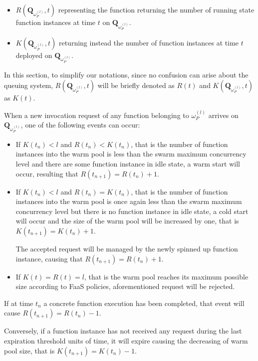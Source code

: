 \documentclass[12pt,a4paper]{report}
\begin{document}
\begin{itemize}
	\item $R(\textbf{Q}_{\omega_{P}^{(l)}}, t)$ representing the function returning the number of running state function instances at time $t$ on $\textbf{Q}_{\omega_{P}^{(l)}}$.
	
	\item $K(\textbf{Q}_{\omega_{P}^{(l)}}, t)$ returning instead the number of function instances at time $t$ deployed on $\textbf{Q}_{\omega_{P}^{(l)}}$.
\end{itemize}

In this section, to simplify our notations, since no confusion can arise about the queuing system, $R(\textbf{Q}_{\omega_{P}^{(l)}}, t)$ will be briefly denoted as $R(t)$ and $K(\textbf{Q}_{\omega_{P}^{(l)}}, t)$ as $K(t)$.

When a new invocation request of any function belonging to $\omega_{P}^{(l)}$ arrives on $\textbf{Q}_{\omega_{P}^{(l)}}$, one of the following events can occur:

\begin{itemize}
	\item If $K(t_n) < l$ and $R(t_n) < K(t_n)$, that is the number of function instances into the warm pool is less than the swarm maximum concurrency level and there are some function instance in idle state, a warm start will occur, resulting that $R(t_{n+1}) = R(t_n) + 1$.
	
	
	\item If $K(t_n) < l$ and $R(t_n) = K(t_n)$, that is the number of function instances into the warm pool is once again less than the swarm maximum concurrency level but there is no function instance in idle state, a cold start will occur and the size of the warm pool will be increased by one, that is $K(t_{n+1}) = K(t_n) + 1$.
	
	The accepted request will be managed by the newly spinned up function instance, causing that $R(t_{n+1}) = R(t_n) + 1$.
	
	\item If $K(t) = R(t) = l$, that is the warm pool reaches its maximum possible size according to FaaS policies, aforementioned request will be rejected.
\end{itemize}

If at time $t_n$ a concrete function execution has been completed, that event will cause $R(t_{n+1}) = R(t_n) - 1$. 

Conversely, if a function instance has not  received any request during the last expiration threshold units of time, it will expire causing the decreasing of warm pool size, that is $K(t_{n+1}) = K(t_n) - 1$.
\end{document}
